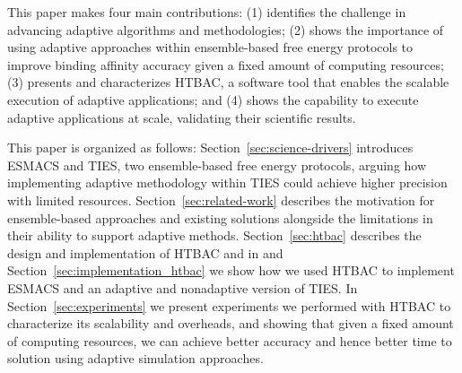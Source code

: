 
This paper makes four main contributions: (1) identifies the challenge in
advancing adaptive algorithms and methodologies; (2) shows the importance of
using adaptive approaches within ensemble-based free energy protocols to
improve binding affinity accuracy given a fixed amount of computing
resources; (3) presents and characterizes HTBAC, a software tool that enables
the scalable execution of adaptive applications; and (4) shows the capability
to execute adaptive applications at scale, validating their scientific
results.

This paper is organized as follows: Section~\ref{sec:science-drivers}
introduces ESMACS and TIES, two ensemble-based free energy protocols, arguing
how implementing adaptive methodology within TIES could achieve higher
precision with limited resources. Section~\ref{sec:related-work} describes
the motivation for ensemble-based approaches and existing solutions alongside
the limitations in their ability to support adaptive methods.
Section~\ref{sec:htbac} describes the design and implementation of HTBAC and
in and Section~\ref{sec:implementation_htbac} we show how we used HTBAC to
implement ESMACS and an adaptive and nonadaptive version of TIES. In
Section~\ref{sec:experiments} we present experiments we performed with HTBAC
to characterize its scalability and overheads, and showing that given a fixed
amount of computing resources, we can achieve better accuracy and hence
better time to solution using adaptive simulation approaches.